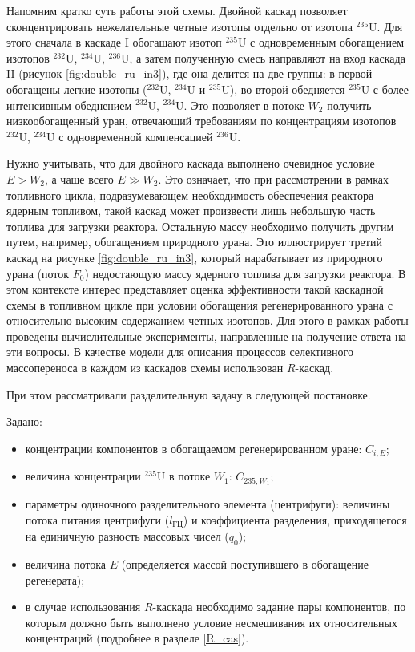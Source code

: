 Напомним кратко суть работы этой схемы. Двойной каскад позволяет сконцентрировать нежелательные четные изотопы отдельно от изотопа $^{235}$U. Для этого сначала в каскаде I обогащают изотоп $^{235}$U с одновременным обогащением изотопов $^{232}$U, $^{234}$U, $^{236}$U, а затем полученную смесь направляют на вход каскада II (рисунок \ref{fig:double_ru_in3}), где она делится на две группы: в первой обогащены легкие изотопы ($^{232}$U, $^{234}$U и $^{235}$U), во второй обедняется $^{235}$U с более интенсивным обеднением $^{232}$U, $^{234}$U. Это позволяет в потоке $W_2$ получить низкообогащенный уран, отвечающий требованиям по концентрациям изотопов $^{232}$U, $^{234}$U с одновременной компенсацией $^{236}$U.

Нужно учитывать, что для двойного каскада выполнено очевидное условие $E>W_2$, а чаще всего $E \gg W_2$. Это означает, что при рассмотрении в рамках топливного цикла, подразумевающем необходимость обеспечения реактора ядерным топливом, такой каскад может произвести лишь небольшую часть топлива для загрузки реактора. Остальную массу необходимо получить другим путем, например, обогащением природного урана. Это иллюстрирует третий каскад на рисунке \ref{fig:double_ru_in3}, который нарабатывает из природного урана (поток $F_0$) недостающую массу ядерного топлива для загрузки реактора. В этом контексте интерес представляет оценка эффективности такой каскадной схемы в топливном цикле при условии обогащения регенерированного урана с относительно высоким содержанием четных изотопов. Для этого в рамках работы проведены вычислительные эксперименты, направленные на получение ответа на эти вопросы. В качестве модели для описания процессов селективного массопереноса в каждом из каскадов схемы использован $R$-каскад. 

При этом рассматривали разделительную задачу в следующей постановке.

Задано:

\begin{itemize}
    \item концентрации компонентов в обогащаемом регенерированном уране: $C_{i,{E}}$; 
    \item величина концентрации $^{235}$U в потоке $W_{1}$: $C_{235,{W_1}}$;
    \item параметры одиночного разделительного элемента (центрифуги): величины потока питания центрифуги ($l_{ГЦ}$) и коэффициента разделения, приходящегося на единичную разность массовых чисел ($q_{0}$);
    \item величина потока $E$ (определяется массой поступившего в обогащение регенерата);
    \item в случае использования $R$-каскада необходимо задание пары компонентов, по которым должно быть выполнено условие несмешивания их относительных концентраций (подробнее в разделе \ref{R_cas}).
\end{itemize}

